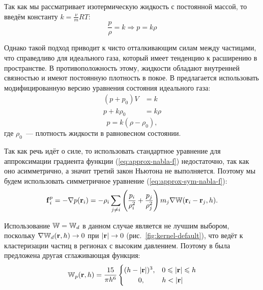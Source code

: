 Так как мы рассматривает изотермическую жидкость с постоянной массой, то введём константу $k=\frac{\nu}{m}RT$:
\[ \frac{p}{\rho}=k\Rightarrow p=k\rho \]

Однако такой подход приводит к чисто отталкивающим силам между частицами, что справедливо для идеального газа, который имеет тенденцию к расширению в пространстве. В противоположность этому, жидкости обладают внутренней связностью и имеют постоянную плотность в покое. В \cite{desbrun} предлагается использовать модифицированную версию уравнения состояния идеального газа:
\begin{align*}
  (p+p_0)V&=k\\
  p+k\rho_0&=k\rho
\end{align*}
\begin{equation} \label{eq:pressure}
  p=k(\rho-\rho_0),
\end{equation}
где $\rho_0$~--- плотность жидкости в равновесном состоянии.

Так как речь идёт о силе, то использовать стандартное уравнение для аппроксимации градиента функции (\ref{eq:approx-nabla-f}) недостаточно, так как оно асимметрично, а значит третий закон Ньютона не выполняется. Поэтому мы будем использовать симметричное уравнение (\ref{eq:approx-sym-nabla-f}):
\[ \boldsymbol{\mathbf{f}}_i^p=-\nabla p(\boldsymbol{\mathbf{r}}_i)=-\rho_i\sum_{j\neq i}\left(\frac{p_i}{\rho_i^2}+\frac{p_j}{\rho_j^2}\right)m_j\nabla\mathbb W(\boldsymbol{\mathbf{r}}_i-\boldsymbol{\mathbf{r}}_j, h). \]

Использование $\mathbb W=\mathbb W_d$ в данном случае является не лучшим выбором, поскольку $\nabla\mathbb W_d(\boldsymbol{\mathbf{r}}, h)\to 0$ при $|\boldsymbol{\mathbf{r}}|\to 0$ (рис.~\ref{fig:kernel-default}), что ведёт к кластеризации частиц в регионах с высоким давлением. Поэтому в \cite{desbrun} была предложена другая сглаживающая функция:
\begin{equation}
  \kernel_p(\vect r, h)=\frac{15}{\pi h^6}
  \begin{cases}
    (h-|\vect r|)^3, & 0\leq|\vect r|\leq h\\
    \qquad 0, & h<|\vect r|
  \end{cases}
\end{equation}

